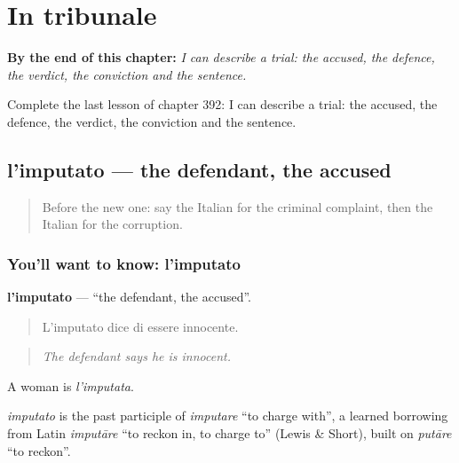 
\chapter{In tribunale}
\label{ch:it-in-tribunale}

\begin{chapteropening}
\textbf{By the end of this chapter:} \emph{I can describe a trial: the accused, the defence, the verdict, the conviction and the sentence.}

Complete the last lesson of chapter 392: I can describe a trial: the accused, the defence, the verdict, the conviction and the sentence.
\end{chapteropening}

\section[l'imputato]{l'imputato — the defendant, the accused}

\label{lesson:IT-C392-imputato}



\begin{quote}
Before the new one: say the Italian for the criminal complaint, then the Italian for the corruption.
\end{quote}

\subsection*{You'll want to know: l'imputato}
\textbf{l'imputato} — \textquotedblleft{}the defendant, the accused\textquotedblright{}.

\begin{quote}
L'imputato dice di essere innocente.
\end{quote}

\begin{quote}
\emph{The defendant says he is innocent.}
\end{quote}

A woman is \emph{l'imputata}.

\begin{cousinweb}
\emph{imputato} is the past participle of \emph{imputare} \textquotedblleft{}to charge with\textquotedblright{}, a learned borrowing from Latin \emph{imputāre} \textquotedblleft{}to reckon in, to charge to\textquotedblright{} (Lewis \& Short), built on \emph{putāre} \textquotedblleft{}to reckon\textquotedblright{}.
\end{cousinweb}

